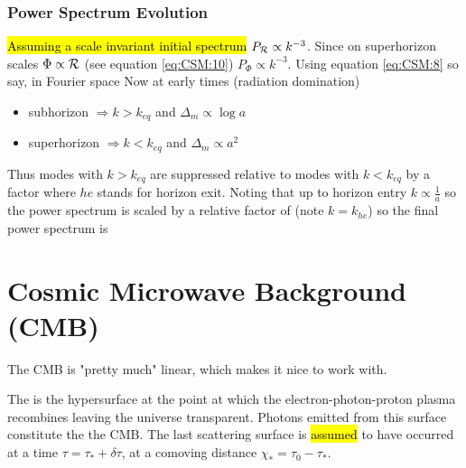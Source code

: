 \documentclass{article}
\begin{document}
\subsubsection*{Power Spectrum Evolution}
\hl{Assuming a scale invariant initial spectrum} $P_{\mathcal{R}} \propto k^{-3}$. Since on superhorizon scales $\Phi \propto \mathcal{R}$ (see equation \ref{eq:CSM:10}) $P_\Phi \propto k^{-3}$. Using equation \ref{eq:CSM:8} so say, in Fourier space 
Now at early times (radiation domination) 
\begin{itemize}
    \item subhorizon $\Rightarrow k> k_{eq}$ and $\Delta_m \propto \log a $
    \item superhorizon $\Rightarrow k < k_{eq}$ and $\Delta_m \propto a^2$
\end{itemize}
Thus modes with $k > k_{eq}$ are suppressed relative to modes with $k < k_{eq}$ by a factor 
where $he$ stands for horizon exit. Noting that up to horizon entry $k \propto \frac{1}{a}$ so the power spectrum is scaled by a relative factor of 
(note $k = k_{he}$) so the final power spectrum is 
\eq{
P_\Delta(k) \propto \left\{ \begin{array}{cc} k^{-3} \left[[\log\left(\frac{k}{k_{eq}}\right)\right]^2 & k>k_{eq} \\ k & k<k_{eq} \end{array} \right.
}

\section{Cosmic Microwave Background (CMB)}
\begin{idea}
The CMB is "pretty much" linear, which makes it nice to work with. 
\end{idea}

\begin{definition}
The  is the hypersurface at the point at which the electron-photon-proton plasma recombines leaving the universe transparent. Photons emitted from this surface constitute the the CMB. The last scattering surface is \hl{assumed} to have occurred at a time $\tau = \tau_\ast + \delta \tau$, at a comoving distance $\chi_\ast = \tau_0 - \tau_\ast$. 
\end{definition}
\end{document}
